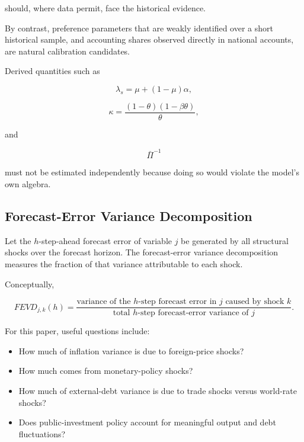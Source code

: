 should, where data permit, face the historical evidence.

By contrast, preference parameters that are weakly identified over a short
historical sample, and accounting shares observed directly in national
accounts, are natural calibration candidates.

Derived quantities such as

\[
\lambda_s=\mu+(1-\mu)\alpha,
\]

\[
\kappa=\frac{(1-\theta)(1-\beta\theta)}{\theta},
\]

and

\[
\bar\Pi^{-1}
\]

must not be estimated independently because doing so would violate the model's
own algebra.

\subsection{Forecast-Error Variance Decomposition}
\label{app:fevd}

Let the \(h\)-step-ahead forecast error of variable \(j\) be generated by all
structural shocks over the forecast horizon. The forecast-error variance
decomposition measures the fraction of that variance attributable to each
shock.

Conceptually,

\begin{equation}
FEVD_{j,k}(h)
=
\frac{
\text{variance of the }h\text{-step forecast error in }j
\text{ caused by shock }k
}{
\text{total }h\text{-step forecast-error variance of }j
}.
\end{equation}

For this paper, useful questions include:

\begin{itemize}
    \item How much of inflation variance is due to foreign-price shocks?
    \item How much comes from monetary-policy shocks?
    \item How much of external-debt variance is due to trade shocks versus
    world-rate shocks?
    \item Does public-investment policy account for meaningful output and debt
    fluctuations?
\end{itemize}

